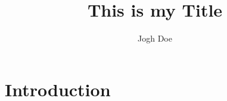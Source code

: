 \documentclass{myarticle}
\title{This is my Title}
\author{Jogh Doe}
\begin{document}
\maketitle

\section{Introduction}
\lipsum[1-2]
\end{document}
